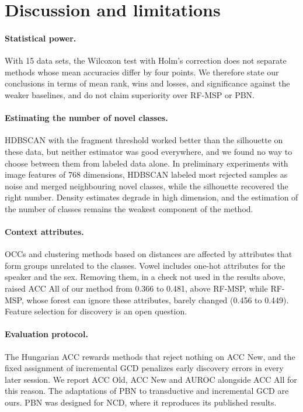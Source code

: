 \documentclass[pdflatex,sn-basic]{sn-jnl}
\begin{document}
\section{Discussion and limitations}\label{sec:discussion}

\paragraph{Statistical power.} With 15 data sets, the Wilcoxon test with Holm's correction does not separate methods whose mean accuracies differ by four points. We therefore state our conclusions in terms of mean rank, wins and losses, and significance against the weaker baselines, and do not claim superiority over RF-MSP or PBN.

\paragraph{Estimating the number of novel classes.} HDBSCAN with the fragment threshold worked better than the silhouette on these data, but neither estimator was good everywhere, and we found no way to choose between them from labeled data alone. In preliminary experiments with image features of 768 dimensions, HDBSCAN labeled most rejected samples as noise and merged neighbouring novel classes, while the silhouette recovered the right number. Density estimates degrade in high dimension, and the estimation of the number of classes remains the weakest component of the method.

\paragraph{Context attributes.} OCCs and clustering methods based on distances are affected by attributes that form groups unrelated to the classes. Vowel includes one-hot attributes for the speaker and the sex. Removing them, in a check not used in the results above, raised ACC All of our method from 0.366 to 0.481, above RF-MSP, while RF-MSP, whose forest can ignore these attributes, barely changed (0.456 to 0.449). Feature selection for discovery is an open question.

\paragraph{Evaluation protocol.} The Hungarian ACC rewards methods that reject nothing on ACC New, and the fixed assignment of incremental GCD penalizes early discovery errors in every later session. We report ACC Old, ACC New and AUROC alongside ACC All for this reason. The adaptations of PBN to transductive and incremental GCD are ours. PBN was designed for NCD, where it reproduces its published results.
\end{document}
